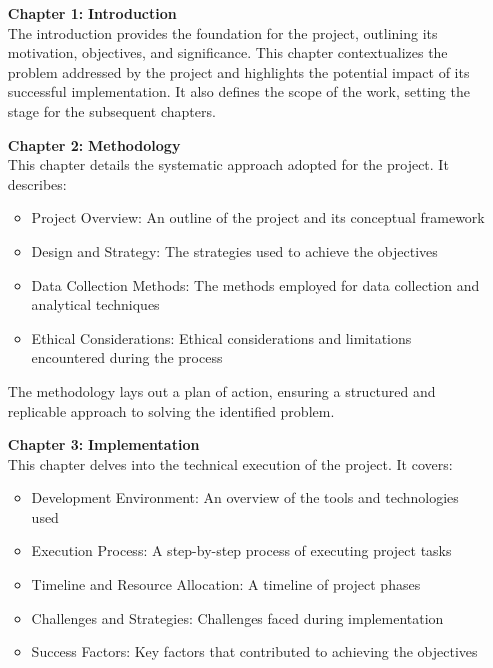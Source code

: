 \begin{itemize}[leftmargin=2.15cm, labelwidth=1.5cm]
    \item[\textbf{Chapter 1:}] \textbf{Introduction}\\
    The introduction provides the foundation for the project, outlining its motivation, objectives, and significance. This chapter contextualizes the problem addressed by the project and highlights the potential impact of its successful implementation. It also defines the scope of the work, setting the stage for the subsequent chapters.

    \item[\textbf{Chapter 2:}] \textbf{Methodology}\\
    This chapter details the systematic approach adopted for the project. It describes:
    \begin{itemize}
        \item Project Overview: An outline of the project and its conceptual framework
        \item Design and Strategy: The strategies used to achieve the objectives
        \item Data Collection Methods: The methods employed for data collection and analytical techniques
        \item Ethical Considerations: Ethical considerations and limitations encountered during the process
    \end{itemize}
    The methodology lays out a plan of action, ensuring a structured and replicable approach to solving the identified problem.

    \item[\textbf{Chapter 3:}] \textbf{Implementation}\\
    This chapter delves into the technical execution of the project. It covers:
    \begin{itemize}
        \item Development Environment: An overview of the tools and technologies used
        \item Execution Process: A step-by-step process of executing project tasks
        \item Timeline and Resource Allocation: A timeline of project phases
        \item Challenges and Strategies: Challenges faced during implementation
        \item Success Factors: Key factors that contributed to achieving the objectives
    \end{itemize}


\end{itemize}
